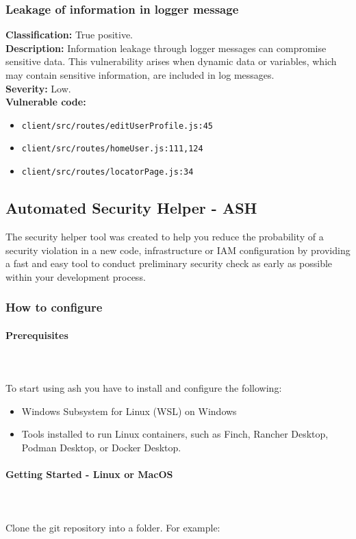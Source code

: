 \documentclass[]{article}
\begin{document}
\subsubsection{Leakage of information in logger message}
\textbf{Classification:} True positive. \\
\textbf{Description:} Information leakage through logger messages can compromise sensitive data. This vulnerability arises when dynamic data or variables, which may contain sensitive information, are included in log messages. \\ 
\textbf{Severity:} Low. \\ 
\textbf{Vulnerable code:}
\begin{itemize}
    \item \texttt{client/src/routes/editUserProfile.js:45}
    \item \texttt{client/src/routes/homeUser.js:111,124}
    \item \texttt{client/src/routes/locatorPage.js:34}
\end{itemize}

\subsection{Automated Security Helper - ASH}
The security helper tool was created to help you reduce the probability of a security violation in a new code, infrastructure or IAM configuration by providing a fast and easy tool to conduct preliminary security check as early as possible within your development process.

\subsubsection{How to configure}
\paragraph{Prerequisites} \mbox{} \\ \\
To start using ash you have to install and configure the following:
\begin{itemize}
\item Windows Subsystem for Linux (WSL) on Windows 
\item Tools installed to run Linux containers, such as Finch, Rancher Desktop, Podman Desktop, or Docker Desktop.
\end{itemize}

\paragraph{Getting Started - Linux or MacOS} \mbox{} \\ \\
Clone the git repository into a folder. For example:
\end{document}
